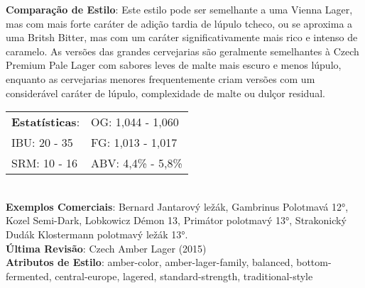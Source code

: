 \textbf{Comparação de Estilo}: Este estilo pode ser semelhante a uma Vienna Lager, mas com mais forte caráter de adição tardia de lúpulo tcheco, ou se aproxima a uma Britsh Bitter, mas com um caráter significativamente mais rico e intenso de caramelo. As versões das grandes cervejarias são geralmente semelhantes à Czech Premium Pale Lager com sabores leves de malte mais escuro e menos lúpulo, enquanto as cervejarias menores frequentemente criam versões com um considerável caráter de lúpulo, complexidade de malte ou dulçor residual. \\
\begin{tabular}{@{}p{35mm}p{35mm}@{}}
  \textbf{Estatísticas}: & OG: 1,044 - 1,060 \\
  IBU: 20 - 35  & FG: 1,013 - 1,017  \\
  SRM: 10 - 16   & ABV: 4,4\% - 5,8\%
\end{tabular}\\
\textbf{Exemplos Comerciais}: Bernard Jantarový ležák, Gambrinus Polotmavá 12°, Kozel Semi-Dark, Lobkowicz Démon 13, Primátor polotmavý 13°, Strakonický Dudák Klostermann polotmavý ležák 13°. \\
\textbf{Última Revisão}: Czech Amber Lager (2015) \\
\textbf{Atributos de Estilo}: amber-color, amber-lager-family, balanced, bottom-fermented, central-europe, lagered, standard-strength, traditional-style